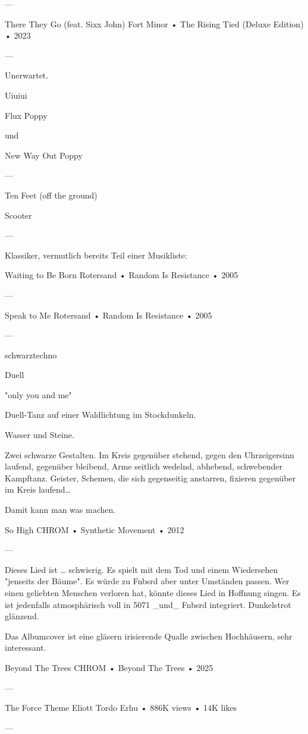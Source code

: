 —

There They Go (feat. Sixx John)
Fort Minor
 •
The Rising Tied (Deluxe Edition)
 •
2023

—

Unerwartet.

Uiuiui

Flux
Poppy

und

New Way Out
Poppy

—

Ten Feet (off the ground)

Scooter

—

Klassiker, vermutlich bereits Teil einer Musikliste:

Waiting to Be Born
Rotersand
 •
Random Is Resistance
 •
2005

—

Speak to Me
Rotersand
 •
Random Is Resistance
 •
2005

—

schwarztechno

Duell

"only you and me"

Duell-Tanz auf einer Waldlichtung im Stockdunkeln.

Wasser und Steine.

Zwei schwarze Gestalten. Im Kreis gegenüber stehend, gegen den Uhrzeigersinn laufend, gegenüber bleibend, Arme seitlich wedelnd, abhebend, schwebender Kampftanz. Geister, Schemen, die sich gegenseitig anstarren, fixieren gegenüber im Kreis laufend…

Damit kann man was machen.

So High
CHROM
 •
Synthetic Movement
 •
2012

—

Dieses Lied ist … schwierig. Es spielt mit dem Tod und einem Wiedersehen "jenseits der Bäume".
Es würde zu Fnbsrd aber unter Umständen passen. Wer einen geliebten Menschen verloren hat, könnte dieses Lied in Hoffnung singen.
Es ist jedenfalls atmosphärisch voll in 5071 _und_ Fnbsrd integriert. Dunkelstrot glänzend.

Das Albumcover ist eine gläsern irisierende Qualle zwischen Hochhäusern, sehr interessant.

Beyond The Trees
CHROM
 •
Beyond The Trees
 •
2025

—

The Force Theme
Eliott Tordo Erhu
 •
886K views
 •
14K likes

—

